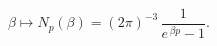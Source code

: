 \begin{equation}
\beta \mapsto N_p(\beta) = (2\pi)^{-3} \, 
\frac{1}{e^{\, \beta p} - 1}.
\end{equation}


